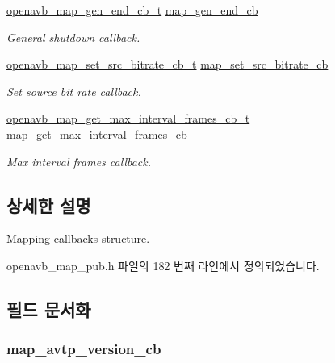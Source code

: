 \begin{DoxyCompactItemize}
\hyperlink{include_2openavb__map__pub_8h_a190110090de2b4c2348a8077191d6412}{openavb\+\_\+map\+\_\+gen\+\_\+end\+\_\+cb\+\_\+t} \hyperlink{structopenavb__map__cb__t_aefd70fa9d3e6cd61a4b7f1272a1eedcd}{map\+\_\+gen\+\_\+end\+\_\+cb}
\begin{DoxyCompactList}\small\item\em General shutdown callback. \end{DoxyCompactList}\item 
\hyperlink{include_2openavb__map__pub_8h_a73df833dff27fbab0f482687f6645553}{openavb\+\_\+map\+\_\+set\+\_\+src\+\_\+bitrate\+\_\+cb\+\_\+t} \hyperlink{structopenavb__map__cb__t_a51d32b904dad1b9f7dd1d6169128d806}{map\+\_\+set\+\_\+src\+\_\+bitrate\+\_\+cb}
\begin{DoxyCompactList}\small\item\em Set source bit rate callback. \end{DoxyCompactList}\item 
\hyperlink{include_2openavb__map__pub_8h_a1c94e44a1af532f7d2089816b24073ba}{openavb\+\_\+map\+\_\+get\+\_\+max\+\_\+interval\+\_\+frames\+\_\+cb\+\_\+t} \hyperlink{structopenavb__map__cb__t_af91d6f178bc808c13b21abab3861accb}{map\+\_\+get\+\_\+max\+\_\+interval\+\_\+frames\+\_\+cb}
\begin{DoxyCompactList}\small\item\em Max interval frames callback. \end{DoxyCompactList}\end{DoxyCompactItemize}


\subsection{상세한 설명}
Mapping callbacks structure. 

openavb\+\_\+map\+\_\+pub.\+h 파일의 182 번째 라인에서 정의되었습니다.



\subsection{필드 문서화}
\subsubsection[{\texorpdfstring{map\+\_\+avtp\+\_\+version\+\_\+cb}{map_avtp_version_cb}}]{ map\+\_\+avtp\+\_\+version\+\_\+cb}\hypertarget{structopenavb__map__cb__t_a185e195210352d990db73d5ed37b5533}{}\label{structopenavb__map__cb__t_a185e195210352d990db73d5ed37b5533}


